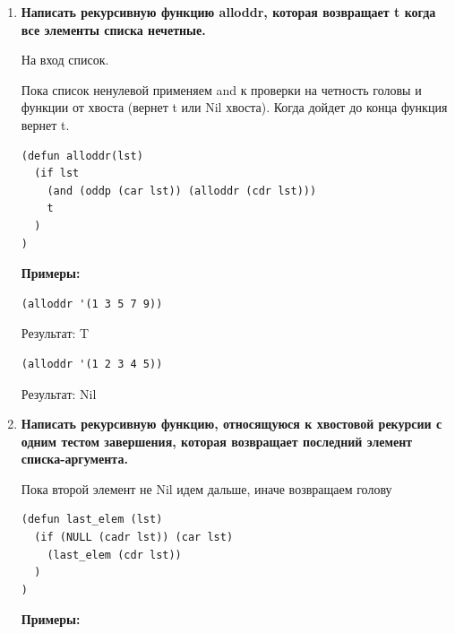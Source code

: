 \documentclass[a4paper,14pt]{extreport} %
\begin{document}
\begin{enumerate}
\begin{lstlisting}
(defun recnth(lst k)
  (cond
    ((> k (length lst)) Nil)
    ((< k 1) Nil)
    (t (recnth_next lst (+ 1 (- (length lst) k))))
  )
)
\end{lstlisting}

\textbf{Примеры:}

\begin{lstlisting}
(recnth '(1 2 3 4 5) 6)
\end{lstlisting}

Результат: Nil

\begin{lstlisting}
(recnth '(1 (2 1) (3 4 5) 4 5) 3)
\end{lstlisting}

Результат: (3 4 5)

\item \textbf{Написать рекурсивную функцию alloddr, которая возвращает t когда все элементы списка нечетные.}

На вход список. 

Пока список ненулевой применяем and к проверки на четность головы и функции от хвоста (вернет t или Nil хвоста). Когда дойдет до конца функция вернет t. 

\begin{lstlisting}
(defun alloddr(lst)
  (if lst
    (and (oddp (car lst)) (alloddr (cdr lst)))
    t
  )
)
\end{lstlisting}

\textbf{Примеры:}

\begin{lstlisting}
(alloddr '(1 3 5 7 9))
\end{lstlisting}

Результат: T

\begin{lstlisting}
(alloddr '(1 2 3 4 5))
\end{lstlisting}

Результат: Nil

\item \textbf{Написать рекурсивную функцию, относящуюся к хвостовой рекурсии с одним тестом завершения, которая возвращает последний элемент списка-аргумента.}

Пока второй элемент не Nil идем дальше, иначе возвращаем голову
 
\begin{lstlisting}
(defun last_elem (lst)
  (if (NULL (cadr lst)) (car lst) 
    (last_elem (cdr lst))
  ) 
)
\end{lstlisting}

\textbf{Примеры:}


\end{enumerate}
\end{document}
